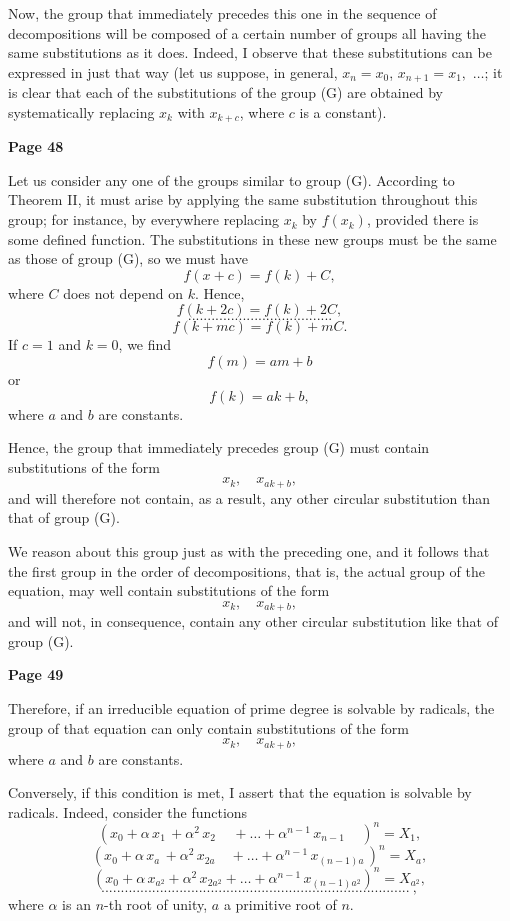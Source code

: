 \documentclass{article}
\begin{document}
Now, the group that immediately precedes this one in the sequence of decompositions will be composed of a certain number of groups all having the same substitutions as it does. Indeed, I observe that these substitutions can be expressed in just that way (let us suppose, in general, $x_n=x_0$, $x_{n+1}=x_1,$ $\dots$; it is clear that each of the substitutions of the group (G) are obtained by systematically replacing $x_k$ with $x_{k + c}$, where $c$ is a constant).

\bigskip

\centerline{\textbf{Page 48}}

Let us consider any one of the groups similar to group (G). According to Theorem II, it must arise by applying the same substitution throughout this group; for instance, by everywhere replacing $x_k$ by $f(x_k)$, provided there is some defined function. The substitutions in these new groups must be the same as those of group (G), so we must have
\[
f(x + c) = f(k) + C,
\]
where $C$ does not depend on $k$. Hence,
\[
f(k + 2c) = f(k) + 2C,
\]
\[
.....................................
\]
\[
f(k + mc) = f(k) + mC.
\]
If $c=1$ and $k=0$, we find
\[
f(m) = am + b
\]
or
\[
f(k) = a k + b,
\]
where $a$ and $b$ are constants.

Hence, the group that immediately precedes group (G) must contain substitutions of the form
\[
x_k,\quad x_{a k + b},
\]
and will therefore not contain, as a result, any other circular substitution than that of group (G).

We reason about this group just as with the preceding one, and it follows that the first group in the order of decompositions, that is, the actual group of the equation, may well contain substitutions of the form
\[
x_k,\quad x_{a k + b},
\]
and will not, in consequence, contain any other circular substitution like that of group (G).

\bigskip

\centerline{\textbf{Page 49}}

Therefore, if an irreducible equation of prime degree is solvable by radicals, the group of that equation can only contain substitutions of the form
\[
x_k,\quad x_{a k + b},
\]
where $a$ and $b$ are constants.

Conversely, if this condition is met, I assert that the equation is solvable by radicals. Indeed, consider the functions
\[
(x_0 + \alpha\, x_1\, + \alpha^2\, x_2\,\quad + \dots + \alpha^{n-1}\, x_{n-1} \,\quad )^n = X_1,
\]
\[
(x_0 + \alpha\, x_a\, + \alpha^{2}\, x_{2a}\quad + \dots + \alpha^{n-1}\, x_{(n-1)a}\, )^n = X_a,
\]
\[
(x_0 + \alpha\, x_{a^2} + \alpha^2\, x_{2a^2} + \dots + \alpha^{n-1}\, x_{(n-1)a^2} )^n = X_{a^2},
\]
\[
...............................................................................\ ,
\]
where $\alpha$ is an $n$-th root of unity, $a$ a primitive root of $n$.
\end{document}
